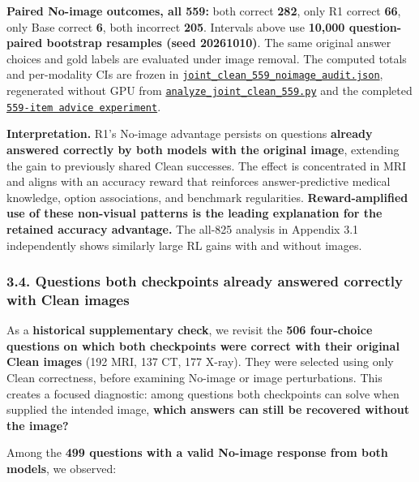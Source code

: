 \documentclass[
  10pt,
  a4paper,
]{article}
\begin{document}
\textbf{Paired No-image outcomes, all 559:} both correct \textbf{282},
only R1 correct \textbf{66}, only Base correct \textbf{6}, both
incorrect \textbf{205}. Intervals above use \textbf{10,000
question-paired bootstrap resamples (seed 20261010)}. The same original
answer choices and gold labels are evaluated under image removal. The
computed totals and per-modality CIs are frozen in
\href{https://github.com/bbuller591-sketch/medical-vlm-visual-reliance/blob/main/results/joint_clean_559_noimage_audit.json}{\texttt{joint\_clean\_559\_noimage\_audit.json}},
regenerated without GPU from
\href{https://github.com/bbuller591-sketch/medical-vlm-visual-reliance/blob/main/scripts/analyze_joint_clean_559.py}{\texttt{analyze\_joint\_clean\_559.py}}
and the completed
\href{https://github.com/bbuller591-sketch/medical-vlm-visual-reliance/blob/main/experiments/visual_advice_conflict_20261009/README.md}{\texttt{559-item\ advice\ experiment}}.

\textbf{Interpretation.} R1's No-image advantage persists on questions
\textbf{already answered correctly by both models with the original
image}, extending the gain to previously shared Clean successes. The
effect is concentrated in MRI and aligns with an accuracy reward that
reinforces answer-predictive medical knowledge, option associations, and
benchmark regularities. \textbf{Reward-amplified use of these non-visual
patterns is the leading explanation for the retained accuracy
advantage.} The all-825 analysis in Appendix 3.1 independently shows
similarly large RL gains with and without images.

\subsubsection{3.4. Questions both checkpoints already answered
correctly with Clean
images}\label{questions-both-checkpoints-already-answered-correctly-with-clean-images}

As a \textbf{historical supplementary check}, we revisit the \textbf{506
four-choice questions on which both checkpoints were correct with their
original Clean images} (192 MRI, 137 CT, 177 X-ray). They were selected
using only Clean correctness, before examining No-image or image
perturbations. This creates a focused diagnostic: among questions both
checkpoints can solve when supplied the intended image, \textbf{which
answers can still be recovered without the image?}

Among the \textbf{499 questions with a valid No-image response from both
models}, we observed:
\end{document}
